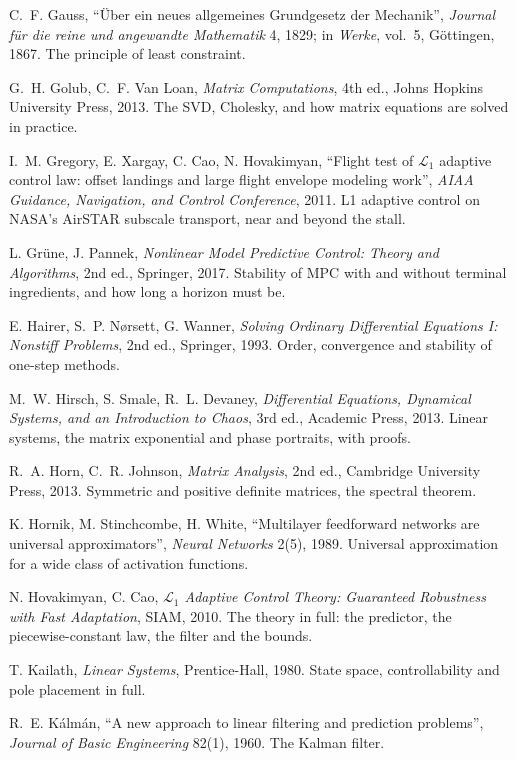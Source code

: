 \begin{description}[leftmargin=1.5em, itemindent=-1.5em, itemsep=5pt, font=\normalfont]
  \item[] C.~F. Gauss, \enquote{Über ein neues allgemeines Grundgesetz der Mechanik}, \emph{Journal für die reine und angewandte Mathematik} 4, 1829; in \emph{Werke}, vol.~5, Göttingen, 1867. The principle of least constraint.
  \item[] G.~H. Golub, C.~F. Van Loan, \emph{Matrix Computations}, 4th ed., Johns Hopkins University Press, 2013. The SVD, Cholesky, and how matrix equations are solved in practice.
  \item[] I.~M. Gregory, E. Xargay, C. Cao, N. Hovakimyan, \enquote{Flight test of $\mathcal L_1$ adaptive control law: offset landings and large flight envelope modeling work}, \emph{AIAA Guidance, Navigation, and Control Conference}, 2011. L1 adaptive control on NASA's AirSTAR subscale transport, near and beyond the stall.
  \item[] L. Grüne, J. Pannek, \emph{Nonlinear Model Predictive Control: Theory and Algorithms}, 2nd ed., Springer, 2017. Stability of MPC with and without terminal ingredients, and how long a horizon must be.
  \item[] E. Hairer, S.~P. Nørsett, G. Wanner, \emph{Solving Ordinary Differential Equations I: Nonstiff Problems}, 2nd ed., Springer, 1993. Order, convergence and stability of one-step methods.
  \item[] M.~W. Hirsch, S. Smale, R.~L. Devaney, \emph{Differential Equations, Dynamical Systems, and an Introduction to Chaos}, 3rd ed., Academic Press, 2013. Linear systems, the matrix exponential and phase portraits, with proofs.
  \item[] R.~A. Horn, C.~R. Johnson, \emph{Matrix Analysis}, 2nd ed., Cambridge University Press, 2013. Symmetric and positive definite matrices, the spectral theorem.
  \item[] K. Hornik, M. Stinchcombe, H. White, \enquote{Multilayer feedforward networks are universal approximators}, \emph{Neural Networks} 2(5), 1989. Universal approximation for a wide class of activation functions.
  \item[] N. Hovakimyan, C. Cao, \emph{$\mathcal L_1$ Adaptive Control Theory: Guaranteed Robustness with Fast Adaptation}, SIAM, 2010. The theory in full: the predictor, the piecewise-constant law, the filter and the bounds.
  \item[] T. Kailath, \emph{Linear Systems}, Prentice-Hall, 1980. State space, controllability and pole placement in full.
  \item[] R.~E. Kálmán, \enquote{A new approach to linear filtering and prediction problems}, \emph{Journal of Basic Engineering} 82(1), 1960. The Kalman filter.

\end{description}
